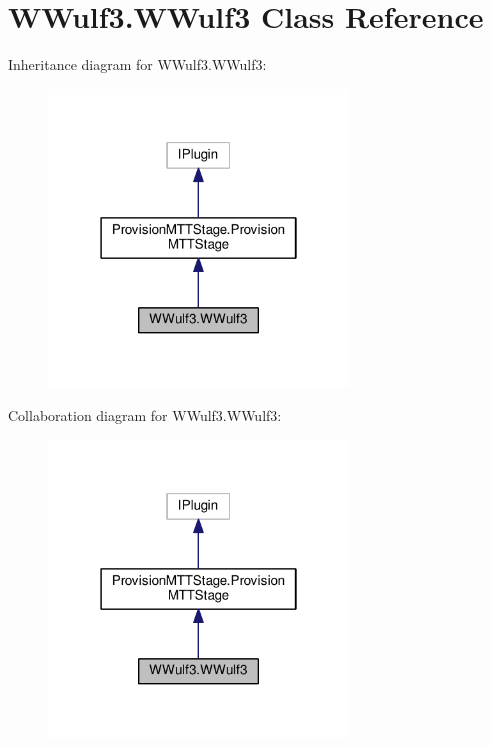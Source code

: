 \hypertarget{classWWulf3_1_1WWulf3}{\section{W\-Wulf3.\-W\-Wulf3 Class Reference}
\label{classWWulf3_1_1WWulf3}
}


Inheritance diagram for W\-Wulf3.\-W\-Wulf3\-:
\nopagebreak
\begin{figure}[H]
\begin{center}
\leavevmode
\includegraphics[width=226pt]{classWWulf3_1_1WWulf3__inherit__graph}
\end{center}
\end{figure}


Collaboration diagram for W\-Wulf3.\-W\-Wulf3\-:
\nopagebreak
\begin{figure}[H]
\begin{center}
\leavevmode
\includegraphics[width=226pt]{classWWulf3_1_1WWulf3__coll__graph}
\end{center}
\end{figure}
